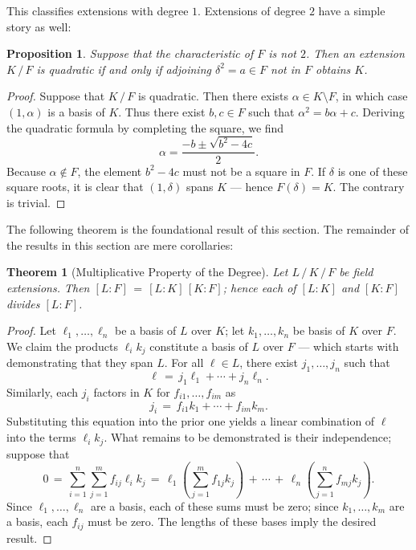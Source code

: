 \documentclass[11pt]{article}
\newtheorem{theorem}{Theorem}
\newtheorem{proposition}{Proposition}
\begin{document}
This classifies extensions with degree $1$. Extensions of degree $2$ have a simple story as well:

\begin{adjustwidth}{0.5cm}{}
  \begin{proposition}
    Suppose that the characteristic of $F$ is not $2$. Then an extension $K \, / \, F$ is quadratic if and only if adjoining $\delta^{2} = a \in F$ not in $F$ obtains $K$.
  \end{proposition}
  \begin{proof}
    Suppose that $K \, / \, F$ is quadratic. Then there exists $\alpha \in K \setminus F$, in which case $(1, \alpha)$ is a basis of $K$. Thus there exist $b, c \in F$ such that $\alpha^{2} = b \alpha + c$. Deriving the quadratic formula by completing the square, we find
    \[
      \alpha = \frac{-b \pm \sqrt{b^{2} - 4c}}{2}.
    \]
    Because $\alpha \notin F$, the element $b^{2} - 4c$ must not be a square in $F$. If $\delta$ is one of these square roots, it is clear that $(1, \delta)$ spans $K$ --- hence $F(\delta) = K$. The contrary is trivial.
  \end{proof}
\end{adjustwidth}

The following theorem is the foundational result of this section. The remainder of the results in this section are mere corollaries:

\begin{adjustwidth}{0.5cm}{}
  \begin{theorem}[Multiplicative Property of the Degree]
    Let $L \, / \, K \, / \, F$ be field extensions. Then $[L : F] \, = \, [L : K] \, [K : F]$; hence each of $[L : K]$ and $[K : F]$ divides $[L : F]$.
  \end{theorem}
  \begin{proof}
    Let $\ell_{1}, \ldots, \ell_{n}$ be a basis of $L$ over $K$; let $k_{1}, \ldots, k_{n}$ be  basis of $K$ over $F$. We claim the products $\ell_{i}k_{j}$ constitute a basis of $L$ over $F$ --- which starts with demonstrating that they span $L$. For all $\ell \in L$, there exist $j_{1}, \ldots, j_{n}$ such that
    \[
      \ell \, = \, j_{1} \ell_{1} + \cdots + j_{n} \ell_{n}.
    \]
    Similarly, each $j_{i}$ factors in $K$ for $f_{i1}, \ldots, f_{im}$ as 
    \[
      j_{i} \, = \, f_{i1} k_{1} + \cdots + f_{im} k_{m}.
    \]
    Substituting this equation into the prior one yields a linear combination of $\ell$ into the terms $\ell_{i}k_{j}$. What remains to be demonstrated is their independence; suppose that
    \[
      0 \, = \, \sum\limits_{i = 1}^{n} \sum\limits_{j = 1}^{m} f_{ij} \ell_{i} k_{j} \, = \, \ell_{1} \left( \sum\limits_{j = 1}^{m} f_{1j} k_{j} \right) \, + \, \cdots \, + \, \ell_{n} \left( \sum\limits_{j = 1}^{n} f_{mj}k_{j} \right).
    \]
    Since $\ell_{1}, \ldots, \ell_{n}$ are a basis, each of these sums must be zero; since $k_{1}, \ldots, k_{m}$ are a basis, each $f_{ij}$ must be zero. The lengths of these bases imply the desired result.
  \end{proof}
\end{adjustwidth}
\end{document}
